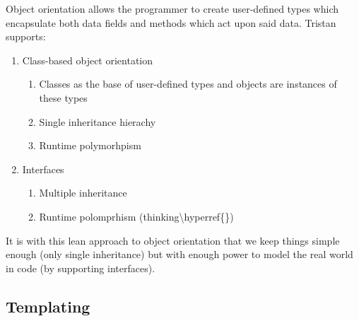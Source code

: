 Object orientation allows the programmer to create user-defined types
which encapsulate both data fields and methods which act upon said
data. Tristan supports:
\begin{enumerate}
\item Class-based object orientation
\begin{enumerate}
\item Classes as the base of user-defined types and objects are instances
of these types
\item Single inheritance hierachy
\item Runtime polymorhpism
\end{enumerate}
\item Interfaces
\begin{enumerate}
\item Multiple inheritance
\item Runtime polomprhism (thinking\textbackslash hyperref\{\})
\end{enumerate}
\end{enumerate}
It is with this lean approach to object orientation that we keep things
simple enough (only single inheritance) but with enough power to model
the real world in code (by supporting interfaces).

\subsection{Templating}

